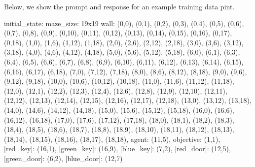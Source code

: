 Below, we show the prompt and response for an example training data pint.

\begin{tcolorbox}[title=Prompt, colback=white]
initial\_state: maze\_size: 19x19 wall: (0,0), (0,1), (0,2), (0,3), (0,4), (0,5), (0,6), (0,7), (0,8), (0,9), (0,10), (0,11), (0,12), (0,13), (0,14), (0,15), (0,16), (0,17), (0,18), (1,0), (1,6), (1,12), (1,18), (2,0), (2,6), (2,12), (2,18), (3,0), (3,6), (3,12), (3,18), (4,0), (4,6), (4,12), (4,18), (5,0), (5,6), (5,12), (5,18), (6,0), (6,1), (6,3), (6,4), (6,5), (6,6), (6,7), (6,8), (6,9), (6,10), (6,11), (6,12), (6,13), (6,14), (6,15), (6,16), (6,17), (6,18), (7,0), (7,12), (7,18), (8,0), (8,6), (8,12), (8,18), (9,0), (9,6), (9,12), (9,18), (10,0), (10,6), (10,12), (10,18), (11,0), (11,6), (11,12), (11,18), (12,0), (12,1), (12,2), (12,3), (12,4), (12,6), (12,8), (12,9), (12,10), (12,11), (12,12), (12,13), (12,14), (12,15), (12,16), (12,17), (12,18), (13,0), (13,12), (13,18), (14,0), (14,6), (14,12), (14,18), (15,0), (15,6), (15,12), (15,18), (16,0), (16,6), (16,12), (16,18), (17,0), (17,6), (17,12), (17,18), (18,0), (18,1), (18,2), (18,3), (18,4), (18,5), (18,6), (18,7), (18,8), (18,9), (18,10), (18,11), (18,12), (18,13), (18,14), (18,15), (18,16), (18,17), (18,18), agent: (11,5), objective: (1,1), [red\_key]: (16,1), [green\_key]: (16,9), [blue\_key]: (7,2), [red\_door]: (12,5), [green\_door]: (6,2), [blue\_door]: (12,7) 
\end{tcolorbox}




